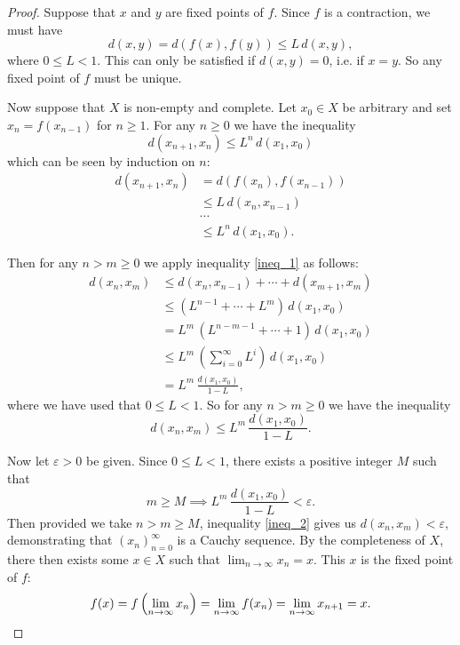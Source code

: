 \documentclass[12pt]{article}
\newcommand{\newp}{\vspace{5mm}}
\theoremstyle{definition}
\begin{document}
\begin{proof}
Suppose that \( x \) and \( y \) are fixed points of \( f \). Since \( f \) is a contraction, we must have
\[
    d(x, y) = d(f(x), f(y)) \leq L \, d(x, y),
\]
where \( 0 \leq L < 1 \). This can only be satisfied if \( d(x, y) = 0 \), i.e. if \( x = y \). So any fixed point of \( f \) must be unique.

\newp

Now suppose that \( X \) is non-empty and complete. Let \( x_0 \in X \) be arbitrary and set \( x_n = f(x_{n-1}) \) for \( n \geq 1 \). For any \( n \geq 0 \) we have the inequality
\begin{equation}
\label{ineq_1}
    \boxed{ d(x_{n+1}, x_n) \leq L^n \, d(x_1, x_0)}
\end{equation}
which can be seen by induction on \( n \):
\begin{align*}
    d(x_{n+1}, x_n) &= d(f(x_n), f(x_{n-1})) \\
    &\leq L \, d(x_n, x_{n-1}) \\
    &\cdots \\
    &\leq L^n \, d(x_1, x_0).
\end{align*}

Then for any \( n > m \geq 0 \) we apply inequality \eqref{ineq_1} as follows:
\begin{align*}
    d(x_n, x_m) &\leq d(x_n, x_{n-1}) + \cdots + d(x_{m+1}, x_m) \\
    &\leq (L^{n-1} + \cdots + L^m) \, d(x_1, x_0) \\
    &= L^m \, (L^{n-m-1} + \cdots + 1) \, d(x_1, x_0) \\
    &\leq L^m \, \left( \sum_{i=0}^{\infty} L^i \right) \, d(x_1, x_0) \\
    &= L^m \, \frac{d(x_1, x_0)}{1 - L},
\end{align*}
where we have used that \( 0 \leq L < 1 \). So for any \( n > m \geq 0 \) we have the inequality
\begin{equation}
\label{ineq_2}
    \boxed{ d(x_n, x_m) \leq L^m \, \frac{d(x_1, x_0)}{1 - L}.}
\end{equation}

Now let \( \varepsilon > 0 \) be given. Since \( 0 \leq L < 1 \), there exists a positive integer \( M \) such that
\[
    m \geq M \implies L^m \, \frac{d(x_1, x_0)}{1 - L} < \varepsilon.
\]
Then provided we take \( n > m \geq M \), inequality \eqref{ineq_2} gives us \( d(x_n, x_m) < \varepsilon \), demonstrating that \( (x_n)_{n=0}^{\infty} \) is a Cauchy sequence. By the completeness of \( X \), there then exists some \( x \in X \) such that \( \lim_{n\to\infty} x_n = x \). This \( x \) is the fixed point of \( f \):
\[
    f(x) = f\left( \lim_{n\to\infty} x_n \right) = \lim_{n\to\infty} f(x_n) = \lim_{n\to\infty} x_{n+1} = x. \qedhere
\]
\end{proof}
\end{document}
